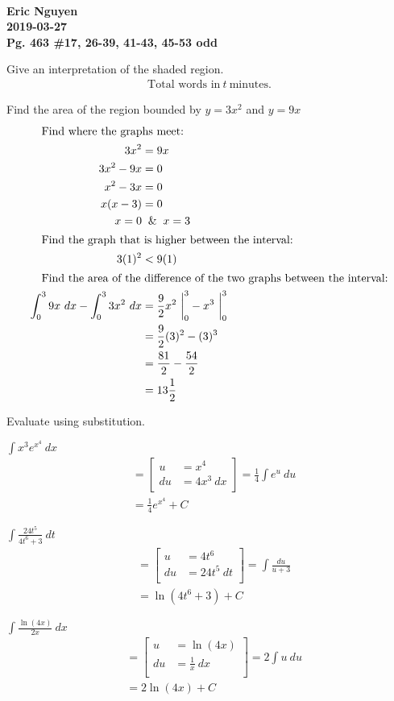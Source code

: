 \documentclass[12pt]{article}
\newenvironment{problem}[2][]{
    \begin{trivlist}
        \item[
            {\bfseries #1}
            {\bfseries #2.}
        ]
}{\end{trivlist}}
\newcommand{\assignment}{Pg. 463 \#17, 26-39, 41-43, 45-53 odd}
\newcommand{\name}{Eric Nguyen}
\newcommand{\duedate}{2019-03-27}
\newcommand{\details}{\textbf{\\\name \\\duedate \\\assignment}}
\newcommand{\descprob}[1]{\hfill\break #1}
\newcommand{\subu}[2]{
\left[
\begin{alignedat}{1}
u &= #1 \\
du &= #2 \\
\end{alignedat}
\right] 
}
\newcommand{\descmeet}{\shortintertext{\quad Find where the graphs meet:}}
\newcommand{\deschigh}{\shortintertext{\quad Find the graph that is higher between the interval:}}
\newcommand{\descarea}{\shortintertext{\quad Find the area of the difference of the two graphs between the interval:}}
\begin{document}
\details

\begin{problem}{17}
Give an interpretation of the shaded region.
\begin{align}
\text{Total words in} ~ t ~ \text{minutes}.
\end{align}
\end{problem}

\begin{problem}{26}
Find the area of the region bounded by $y = 3x^2$ and $y = 9x$
\begin{align}
\descmeet
3x^2 &= 9x \\
3x^2 - 9x &= 0 \\
x^2 - 3x &= 0 \\
x(x - 3) &= 0 \\
x = 0 &\And x = 3 \\
\deschigh
3(1)^2 &< 9(1) \\
\descarea
\int_0^3 9x ~ dx - \int_0^3 3x^2 ~ dx &= \frac{9}{2} x^2 ~ \bigg|_0^3 - x^3 ~ \bigg|_0^3 \\
&= \frac{9}{2} (3)^2 - (3)^3 \\
&= \frac{81}{2} - \frac{54}{2} \\
&= 13 \frac{1}{2}
\end{align}
\end{problem}

\descprob{Evaluate using substitution.}

\begin{problem}{27}
$\displaystyle\int x^3 e^{x^4} ~ dx$
\begin{align}
&= \subu{x^4}{4x^3 ~ dx} = \frac{1}{4} \int e^u ~ du \\
&= \frac{1}{4} e^{x^4} + C
\end{align}
\end{problem}

\begin{problem}{28}
$\displaystyle\int \frac{24t^5}{4t^6 + 3} ~ dt$
\begin{align}
&= \subu{4t^6}{24t^5 ~ dt} = \int \frac{du}{u + 3} \\
&= \ln \left(4t^6 + 3\right) + C
\end{align}
\end{problem}

\begin{problem}{29}
    $\displaystyle\int \frac{\ln \left(4x\right)}{2x} ~ dx$
\begin{align}
&= \subu{\ln \left(4x\right)}{\frac{1}{x} ~ dx} = 2 \int u ~ du \\
&= 2 \ln \left(4x\right) + C
\end{align}
\end{problem}
\end{document}
